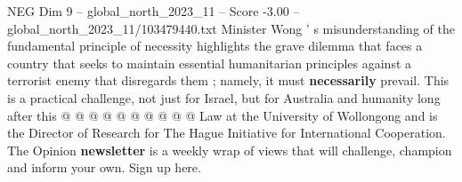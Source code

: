 \begin{textsample}{NEG Dim 9 – global\_north\_2023\_11 – Score -3.00 – global\_north\_2023\_11/103479440.txt}
Minister Wong ' s misunderstanding of the fundamental principle of necessity highlights the grave dilemma that faces a country that seeks to maintain essential humanitarian principles against a terrorist enemy that disregards them ; namely, it must \textbf{necessarily} prevail.
This is a practical challenge, not just for Israel, but for Australia and humanity long after this @ @ @ @ @ @ @ @ @ @ Law at the University of Wollongong and is the Director of Research for The Hague Initiative for International Cooperation.
The Opinion \textbf{newsletter} is a weekly wrap of views that will challenge, champion and inform your own.
Sign up here.

\end{textsample}
